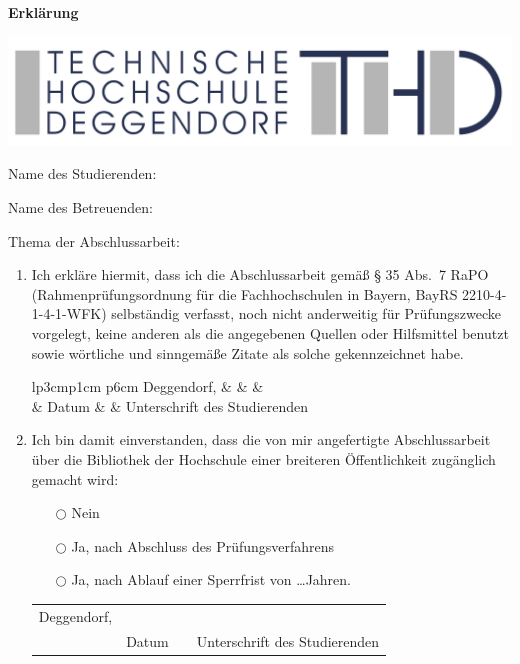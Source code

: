 \thispagestyle{empty}
\newcommand{\signature}[1]{%
\bigskip
\noindent
\begin{tabular*}{\linewidth}{lp{3cm}p{1cm} p{6cm}}
Deggendorf, & \dotfill & & \dotfill \\
& {\footnotesize Datum} & & {\centering \footnotesize #1}
\end{tabular*}
}

\begin{minipage}[b]{.5\linewidth}
	\Large\textbf{Erklärung}
\end{minipage}
\begin{minipage}[b]{.5\linewidth}
	\includegraphics[width=\linewidth]{THD_Logo.pdf}
\end{minipage}

\bigskip

Name des Studierenden: \quad \student

\bigskip
Name des Betreuenden: \quad \supervisor

\vspace{.7cm}
Thema der Abschlussarbeit:

\vspace{.5em}
\dotfill

\vspace{.5em}
\dotfill

\vspace{.5em}
\dotfill

\vspace{.5em}
\dotfill

\begin{enumerate}
	\item Ich erkläre hiermit, dass ich die Abschlussarbeit gemäß § 35 Abs.~7 RaPO (Rahmen\-prüf\-ungs\-ordnung für die Fachhochschulen in Bayern, BayRS 2210-4-1-4-1-WFK)  selbständig  verfasst,  noch  nicht  anderweitig  für Prüfungszwecke  vorgelegt,  keine  anderen  als  die  angegebenen  Quellen  oder Hilfsmittel  benutzt  sowie  wörtliche  und  sinngemäße  Zitate  als  solche gekenn\-zeichnet habe.

		\signature{Unterschrift des Studierenden}

	\item  Ich  bin  damit  einverstanden, dass die von  mir angefertigte  Abschlussarbeit über die Bibliothek der Hochschule einer breiteren Öffentlichkeit zugänglich gemacht wird:
		\begin{itemize}
			\item[$\bigcirc$] Nein
			\item[$\bigcirc$] Ja, nach Abschluss des Prüfungsverfahrens
			\item[$\bigcirc$] Ja, nach Ablauf einer Sperrfrist von \ldots Jahren.
		\end{itemize}

		\signature{Unterschrift des Studierenden}
\end{enumerate}

